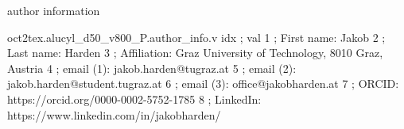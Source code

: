 \expandafter\def\csname oct2tex.alucyl_d50_v800_P.author_info.d\endcsname{author information}
\begin{filecontents}[overwrite]{oct2tex.alucyl_d50_v800_P.author_info.v}
idx ; val
1 ; First name: Jakob
2 ; Last name: Harden
3 ; Affiliation: Graz University of Technology, 8010 Graz, Austria
4 ; email (1): jakob.harden@tugraz.at
5 ; email (2): jakob.harden@student.tugraz.at
6 ; email (3): office@jakobharden.at
7 ; ORCID: https://orcid.org/0000-0002-5752-1785
8 ; LinkedIn: https://www.linkedin.com/in/jakobharden/
\end{filecontents}
